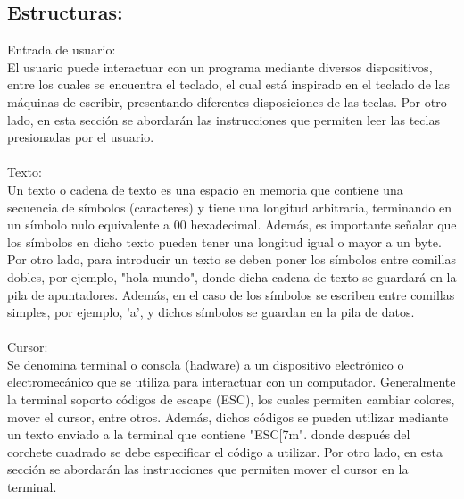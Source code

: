 \documentclass[conference]{IEEEtran}
\begin{document}
\subsection{Estructuras:}
Entrada de usuario: \\
El usuario puede interactuar con un programa mediante diversos dispositivos, entre los cuales se encuentra el teclado, el cual está inspirado en el teclado de las máquinas de escribir, presentando diferentes disposiciones de las teclas. Por otro lado, en esta sección se abordarán las instrucciones que permiten leer las teclas presionadas por el usuario. \\
\\Texto: \\
Un texto o cadena de texto es una espacio en memoria que contiene una secuencia de símbolos (caracteres) y tiene una longitud arbitraria, terminando en un símbolo nulo equivalente a 00 hexadecimal. Además, es importante señalar que los símbolos en dicho texto pueden tener una longitud igual o mayor a un byte. Por otro lado, para introducir un texto se deben poner los símbolos entre comillas dobles, por ejemplo, "hola mundo", donde dicha cadena de texto se guardará en la pila de apuntadores. Además, en el caso de los símbolos se escriben entre comillas simples, por ejemplo, 'a', y dichos símbolos se guardan en la pila de datos. \\
\\Cursor: \\
Se denomina terminal o consola (hadware) a un dispositivo electrónico o electromecánico que se utiliza para interactuar con un computador. Generalmente la terminal soporto códigos de escape (ESC), los cuales permiten cambiar colores, mover el cursor, entre otros. Además, dichos códigos se pueden utilizar mediante un texto enviado a la terminal que contiene "ESC[7m". donde después del corchete cuadrado se debe especificar el código a utilizar. Por otro lado, en esta sección se abordarán las instrucciones que permiten mover el cursor en la terminal.
\end{document}
